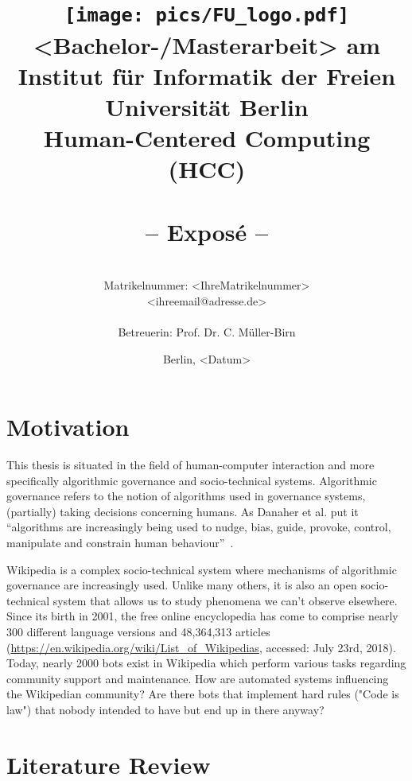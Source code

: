 \documentclass[pdftex,a4paper,11pt]{scrartcl}
\title{\texttt{[image: pics/FU\_logo.pdf]}\\
{\small <Bachelor-/Masterarbeit> am Institut für Informatik der Freien Universität Berlin}\\
{\small Human-Centered Computing (HCC)}\\
[6ex]
{\LARGE<Titel der Arbeit>}\\
{\normalsize-- Exposé --}}
\author{
{\emph{\normalsize<Ihr Vor- und Nachname>}}\\
{\normalsize Matrikelnummer: <IhreMatrikelnummer>}\\
{\normalsize <ihreemail@adresse.de>}\\\\
{\normalsize Betreuerin: Prof. Dr. C. Müller-Birn}
}
\date{\normalsize Berlin, <Datum>}
\newcommand{\blankpage}{
\newpage
\thispagestyle{empty}
\mbox{}
\newpage
}
\begin{document}
\maketitle

\thispagestyle{empty}  %

\blankpage

\setcounter{page}{1} %

\section{Motivation}

This thesis is situated in the field of human-computer interaction and more specifically algorithmic governance and socio-technical systems.
Algorithmic governance refers to the notion of algorithms used in governance systems, (partially) taking decisions concerning humans.
As Danaher et al. put it ``algorithms are increasingly being used to nudge, bias, guide, provoke, control, manipulate and constrain human behaviour''~\cite{DanaherEtAl2017}.

Wikipedia is a complex socio-technical system where mechanisms of algorithmic governance are increasingly used.
Unlike many others, it is also an open socio-technical system that allows us to study phenomena we can't observe elsewhere.
Since its birth in 2001, the free online encyclopedia has come to comprise nearly 300 different language versions and 48,364,313 articles (\url{https://en.wikipedia.org/wiki/List_of_Wikipedias}, accessed: July 23rd, 2018).
Today, nearly 2000 bots exist in Wikipedia which perform various tasks regarding community support and maintenance.
How are automated systems influencing the Wikipedian community?
Are there bots that implement hard rules ("Code is law") that nobody intended to have but end up in there anyway?


\section{Literature Review}
\end{document}
